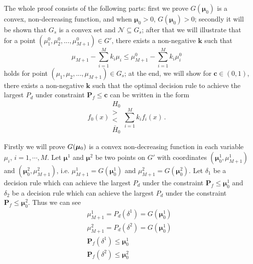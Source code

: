 The whole proof consists of the following parts: first we prove $G(\boldsymbol{\mu}_0)$ is a convex, non-decreasing function, and when $\boldsymbol{\mu}_0 > 0$, $G(\boldsymbol{\mu}_0) > 0$;
secondly it will be shown that $G_s$ is a convex set and $\mathcal{N} \subseteq G_s$; 
after that we will illustrate that for a point $(\mu_1^0, \mu_2^0, ..., \mu_{M+1}^0) \in G'$, there exists a non-negative $\mathbf{k}$ such that 
\[
\mu_{M+1} - \sum_{i=1}^{M}k_i\mu_i \leq \mu_{M+1}^0 - \sum_{i=1}^{M}k_i\mu_i^0
\]
holds for point $(\mu_1, \mu_2, ..., \mu_{M+1}) \in G_s$;
at the end, we will show for $\mathbf{c} \in (0, 1)$, there exists a non-negative $\mathbf{k}$ such that the optimal decision rule to achieve the largest $P_d$ under constraint $\mathbf{P}_f \leq \mathbf{c}$ can be written in the form
\[
f_0(x) \substack{H_0 \\ > \\ < \\ \bar{H}_0} \sum_{i=1}^{M}k_if_i(x)\,.
\]

Firstly we will prove $G(\boldsymbol{\mu}_0)$ is a convex non-decreasing function in each variable $\mu_i$, $i = 1, \cdots, M$.
 Let $\boldsymbol{\mu}^1$ and  $\boldsymbol{\mu}^2$ be two points on $G'$ with coordinates $(\boldsymbol{\mu}^1_0, \mu_{M+1}^1)$ and $(\boldsymbol{\mu}^2_0, \mu_{M+1}^2)$, i.e. $\mu_{M+1}^1 = G(\boldsymbol{\mu}_0^1)$ and $\mu_{M+1}^2 = G(\boldsymbol{\mu}_0^2)$. Let $\delta_1$ be a decision rule which can achieve the largest $P_d$ under the constraint $\mathbf{P}_f \leq \boldsymbol{\mu}_0^1$ and $\delta_2$ be a decision rule which can achieve the largest $P_d$ under the constraint $\mathbf{P}_{f} \leq \boldsymbol{\mu}_0^2$. Thus we can see 
 \begin{subequations}
\begin{align}
&\mu_{M+1}^1 = P_d(\delta^1) = G(\boldsymbol{\mu}_0^1)\\
&\mu_{M+1}^2 = P_d(\delta^2)=G(\boldsymbol{\mu}_0^1)\\
&\mathbf{P}_f(\delta^1) \leq \boldsymbol{\mu}^1_0\\
&\mathbf{P}_f(\delta^2) \leq \boldsymbol{\mu}^2_0
\end{align}
 \end{subequations}
 
